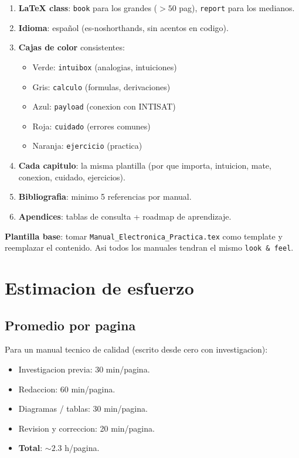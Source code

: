 \documentclass[11pt,a4paper,oneside]{report}
\begin{document}
\begin{enumerate}[leftmargin=2em]
  \item \textbf{LaTeX class}: \texttt{book} para los grandes ($> 50$ pag),
        \texttt{report} para los medianos.
  \item \textbf{Idioma}: español (es-noshorthands, sin acentos en codigo).
  \item \textbf{Cajas de color} consistentes:
    \begin{itemize}[leftmargin=1em]
      \item Verde: \texttt{intuibox} (analogias, intuiciones)
      \item Gris: \texttt{calculo} (formulas, derivaciones)
      \item Azul: \texttt{payload} (conexion con INTISAT)
      \item Roja: \texttt{cuidado} (errores comunes)
      \item Naranja: \texttt{ejercicio} (practica)
    \end{itemize}
  \item \textbf{Cada capitulo}: la misma plantilla (por que importa,
        intuicion, mate, conexion, cuidado, ejercicios).
  \item \textbf{Bibliografia}: minimo 5 referencias por manual.
  \item \textbf{Apendices}: tablas de consulta + roadmap de aprendizaje.
\end{enumerate}

\begin{nota}
\textbf{Plantilla base}: tomar \texttt{Manual\_Electronica\_Practica.tex}
como template y reemplazar el contenido. Asi todos los manuales tendran
el mismo \texttt{look \& feel}.
\end{nota}

\chapter{Estimacion de esfuerzo}

\section{Promedio por pagina}

Para un manual tecnico de calidad (escrito desde cero con investigacion):

\begin{itemize}[leftmargin=2em]
  \item Investigacion previa: 30 min/pagina.
  \item Redaccion: 60 min/pagina.
  \item Diagramas / tablas: 30 min/pagina.
  \item Revision y correccion: 20 min/pagina.
  \item \textbf{Total}: $\sim 2.3$ h/pagina.
\end{itemize}
\end{document}
